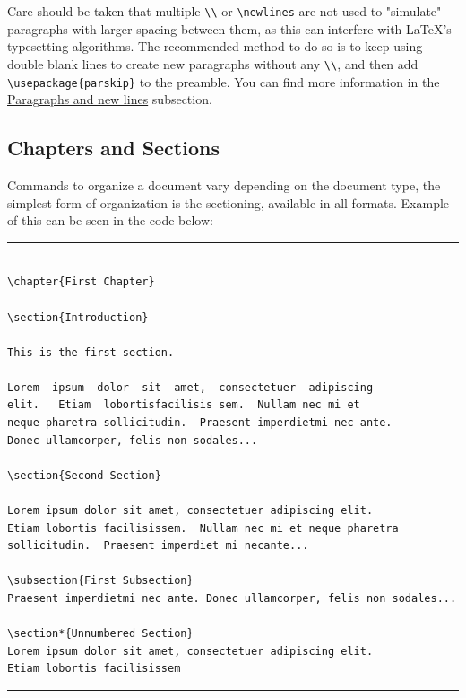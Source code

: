 \documentclass[12pt]{article}
\begin{document}
Care should be taken that multiple \verb+\\+ or \verb+\newlines+ are not used to "simulate" paragraphs with larger spacing between them, as this can interfere with LaTeX's typesetting algorithms. The recommended method to do so is to keep using double blank lines to create new paragraphs without any \verb+\\+, and then add \verb+\usepackage{parskip}+ to the preamble. You can find more information in the \hyperref[subsec:Parag-nwl]{Paragraphs and new lines} subsection.

\subsection{Chapters and Sections}


\begin{minipage}{\linewidth}
Commands to organize a document vary depending on the document type, the simplest form of organization is the sectioning, available in all formats. Example of this can be seen in the code below:

\rule[-.3\baselineskip]{\linewidth}{.1mm}
\begin{lstlisting}

\chapter{First Chapter}

\section{Introduction}

This is the first section.

Lorem  ipsum  dolor  sit  amet,  consectetuer  adipiscing  
elit.   Etiam  lobortisfacilisis sem.  Nullam nec mi et 
neque pharetra sollicitudin.  Praesent imperdietmi nec ante. 
Donec ullamcorper, felis non sodales...

\section{Second Section}

Lorem ipsum dolor sit amet, consectetuer adipiscing elit.  
Etiam lobortis facilisissem.  Nullam nec mi et neque pharetra 
sollicitudin.  Praesent imperdiet mi necante...

\subsection{First Subsection}
Praesent imperdietmi nec ante. Donec ullamcorper, felis non sodales...

\section*{Unnumbered Section}
Lorem ipsum dolor sit amet, consectetuer adipiscing elit.  
Etiam lobortis facilisissem
\end{lstlisting}
\rule[1cm]{\linewidth}{.1mm}
\end{minipage}
\end{document}
